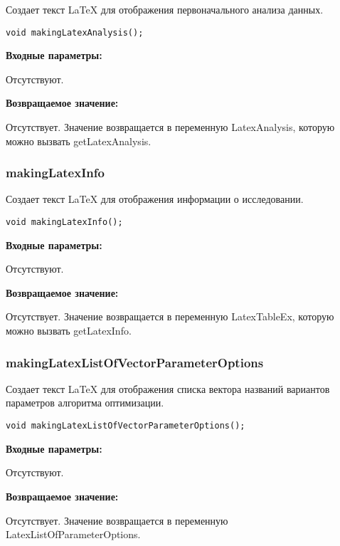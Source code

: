 \documentclass[a4paper,12pt]{article}
\begin{document}
Создает текст LaTeX для отображения первоначального анализа данных.


\begin{lstlisting}[label=code_syntax_makingLatexAnalysis,caption=Синтаксис]
void makingLatexAnalysis();
\end{lstlisting}

\textbf{Входные параметры:}

Отсутствуют.

\textbf{Возвращаемое значение:}

Отсутствует. Значение возвращается в переменную LatexAnalysis, которую можно вызвать getLatexAnalysis.


\subsubsection{makingLatexInfo}\label{makingLatexInfo}

Создает текст LaTeX для отображения информации о исследовании.


\begin{lstlisting}[label=code_syntax_makingLatexInfo,caption=Синтаксис]
void makingLatexInfo();
\end{lstlisting}

\textbf{Входные параметры:}

Отсутствуют.

\textbf{Возвращаемое значение:}

Отсутствует. Значение возвращается в переменную LatexTableEx, которую можно вызвать getLatexInfo.


\subsubsection{makingLatexListOfVectorParameterOptions}\label{makingLatexListOfVectorParameterOptions}

Создает текст LaTeX для отображения списка вектора названий вариантов параметров алгоритма оптимизации.


\begin{lstlisting}[label=code_syntax_makingLatexListOfVectorParameterOptions,caption=Синтаксис]
void makingLatexListOfVectorParameterOptions();
\end{lstlisting}

\textbf{Входные параметры:}

Отсутствуют.

\textbf{Возвращаемое значение:}

Отсутствует. Значение возвращается в переменную LatexListOfParameterOptions.
\end{document}
